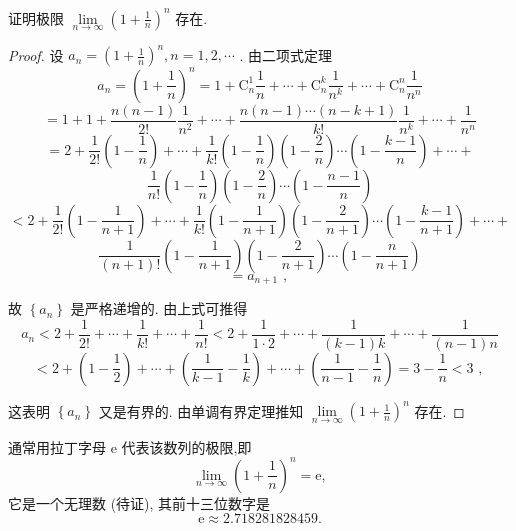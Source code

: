 \begin{example}
证明极限 \(\mathop{\lim }\limits_{{n \rightarrow  \infty }}{\left( 1 + \frac{1}{n}\right) }^{n}\) 存在.

\end{example}

\begin{proof}
设 \({a}_{n} = {\left( 1 + \frac{1}{n}\right) }^{n},n = 1,2,\cdots\) . 由二项式定理
\[
{a}_{n} = {\left( 1 + \frac{1}{n}\right) }^{n} = 1 + {\mathrm{C}}_{n}^{1}\frac{1}{n} + \cdots  + {\mathrm{C}}_{n}^{k}\frac{1}{{n}^{k}} + \cdots  + {\mathrm{C}}_{n}^{n}\frac{1}{{n}^{n}}
\]
\[
= 1 + 1 + \frac{n\left( {n - 1}\right) }{2!}\frac{1}{{n}^{2}} + \cdots  + \frac{n\left( {n - 1}\right) \cdots \left( {n - k + 1}\right) }{k!}\frac{1}{{n}^{k}} + \cdots  + \frac{1}{{n}^{n}}
\]
\[
= 2 + \frac{1}{2!}\left( {1 - \frac{1}{n}}\right)  + \cdots  + \frac{1}{k!}\left( {1 - \frac{1}{n}}\right) \left( {1 - \frac{2}{n}}\right) \cdots \left( {1 - \frac{k - 1}{n}}\right)  + \cdots  +
\]
\[
\frac{1}{n!}\left( {1 - \frac{1}{n}}\right) \left( {1 - \frac{2}{n}}\right) \cdots \left( {1 - \frac{n - 1}{n}}\right)
\]
\[
< 2 + \frac{1}{2!}\left( {1 - \frac{1}{n + 1}}\right)  + \cdots  + \frac{1}{k!}\left( {1 - \frac{1}{n + 1}}\right) \left( {1 - \frac{2}{n + 1}}\right) \cdots \left( {1 - \frac{k - 1}{n + 1}}\right)  + \cdots  +
\]
\[
\frac{1}{\left( {n + 1}\right) !}\left( {1 - \frac{1}{n + 1}}\right) \left( {1 - \frac{2}{n + 1}}\right) \cdots \left( {1 - \frac{n}{n + 1}}\right)
\]
\[
= {a}_{n + 1}\text{ , }
\]

故 \(\left\{  {a}_{n}\right\}\) 是严格递增的. 由上式可推得
\[
{a}_{n} < 2 + \frac{1}{2!} + \cdots  + \frac{1}{k!} + \cdots  + \frac{1}{n!} < 2 + \frac{1}{1 \cdot  2} + \cdots  + \frac{1}{\left( {k - 1}\right) k} + \cdots  + \frac{1}{\left( {n - 1}\right) n}
\]
\[
< 2 + \left( {1 - \frac{1}{2}}\right)  + \cdots  + \left( {\frac{1}{k - 1} - \frac{1}{k}}\right)  + \cdots  + \left( {\frac{1}{n - 1} - \frac{1}{n}}\right)  = 3 - \frac{1}{n} < 3\text{ , }
\]

这表明 \(\left\{  {a}_{n}\right\}\) 又是有界的. 由单调有界定理推知 \(\mathop{\lim }\limits_{{n \rightarrow  \infty }}{\left( 1 + \frac{1}{n}\right) }^{n}\) 存在.
\end{proof}


通常用拉丁字母 \(\mathrm{e}\) 代表该数列的极限,即
\[
\mathop{\lim }\limits_{{n \rightarrow  \infty }}{\left( 1 + \frac{1}{n}\right) }^{n} = \mathrm{e},
\]
它是一个无理数 (待证), 其前十三位数字是
\[
\mathrm{e} \approx  {2.718281828459}.
\]

